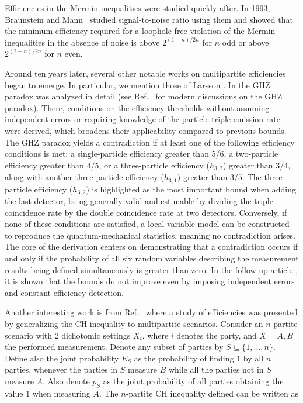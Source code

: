 \documentclass[aps,pra,reprint, superscriptaddress,showkeys]{revtex4-2}
\theoremstyle{plain}
\begin{document}
Efficiencies in the Mermin inequalities were studied quickly after. In 1993, Braunstein and Mann~\cite{Mermin_eff_93} studied signal-to-noise ratio using them and showed that the minimum efficiency required for a loophole-free violation of the Mermin inequalities in the absence of noise is above $2^{(1-n)/2n}$ for $n$ odd or above  $2^{(2-n)/2n}$ for $n$ even. 


Around ten years later, several other notable works on multipartite efficiencies began to emerge. In particular, we mention those of Larsson \cite{PhysRevA.59.4801, CH_n_sites, Larsson_Bell, Larsson_GHZ_1, Larsson_GHZ_2}.
In \cite{Larsson_GHZ_1} the GHZ paradox was analyzed in detail (see Ref.~\cite{hwgb-g93f} for modern discussions on the GHZ paradox).  There,  conditions on the efficiency thresholds without assuming independent errors or requiring knowledge of the particle triple emission rate were derived, which broadens their applicability compared to previous bounds. The GHZ paradox yields a contradiction if at least one of the following efficiency conditions is met: a single-particle efficiency greater than 5/6, a two-particle efficiency greater than $4/5$, or a three-particle efficiency ($h_{3,2}$) greater than $3/4$, along with another three-particle efficiency ($h_{3,1}$) greater than $3/5$. The three-particle efficiency ($h_{3,2}$) is highlighted as the most important bound when adding the last detector, being generally valid and estimable by dividing the triple coincidence rate by the double coincidence rate at two detectors. Conversely, if none of these conditions are satisfied, a local-variable model can be constructed to reproduce the quantum-mechanical statistics, meaning no contradiction arises. The core of the derivation centers on demonstrating that a contradiction occurs if and only if the probability of all six random variables describing the measurement results being defined simultaneously is greater than zero. In the follow-up article \cite{Larsson_GHZ_2}, it is shown that the bounds do not improve even by imposing independent errors and constant efficiency detection.

Another interesting work is from Ref.~\cite{CH_n_sites} where a study of efficiencies was presented by generalizing the CH inequality to multipartite scenarios.  Consider an $n$-partite scenario with $2$ dichotomic settings $X_i$, where $i$ denotes the party, and $X={A,B}$ the performed measurement. Denote any subset of parties by  $S\subseteq\{1,\dots,n\}$. Define also the joint probability $E_S$ as the probability of finding $1$ by all $n$ parties, whenever the parties in $S$ measure $B$ while all the parties not in $S$ measure $A$. Also denote $p_S$ as the joint probability of all parties obtaining the value $1$ when measuring $A$. The $n$-partite CH inequality defined can be written as 
\end{document}
